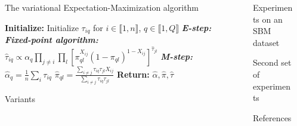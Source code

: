 \documentclass[final]{beamer}
\newlength{\sepwidth}
\newlength{\colwidth}
\newcommand{\separatorcolumn}{\begin{column}{\sepwidth}\end{column}}
\begin{document}
\begin{frame}[t]
\begin{columns}[t]
\begin{column}{\colwidth}
\begin{alertblock}{The variational Expectation-Maximization algorithm}
\begin{minipage}{.9\linewidth}
\begin{algorithm}[H]
\begin{algorithmic}[1]
              \State \textbf{Initialize:} Initialize $\tau_{iq}$ for $i \in \llbracket 1, n \rrbracket$, $q \in \llbracket 1, Q \rrbracket$
              \State \textbf{\emph{E-step:}}
              \State \textbf{\emph{Fixed-point algorithm:}}
              \State $\hat{\tau}_{iq} \propto \alpha_q \prod_{j\neq i}\prod_l \left[\pi_{ql}^{X_{ij}}(1-\pi_{ql})^{1-X_{ij}}\right]^{\hat{\tau}_{jl}}$
              \EndFor
              \EndFor
              \State
              \State \textbf{\emph{M-step:}}
              \State $\hat{\alpha}_q = \frac{1}{n}\sum_{i} \tau_{iq}$ 
              \State $\hat{\pi}_{ql} = \frac{\sum_{i\neq j} \tau_{iq}\tau_{jl}X_{ij}}{\sum_{i\neq j} \tau_{iq}\tau_{jl}}$ 
              \EndFor
              \EndWhile
              \State \textbf{Return:} $\hat{\alpha}, \hat{\pi}, \hat{\tau}$
            \end{algorithmic}
          \end{algorithm}
        \end{minipage}

      \end{alertblock}

      \begin{block}{Variants}

      \end{block}

    \end{column}

    \separatorcolumn

    \begin{column}{\colwidth}

      \begin{block}{Experiments on an SBM dataset}
      \end{block}

      \begin{block}{Second set of experiments}
      \end{block}

      \begin{block}{References}
        \nocite{*}
        \footnotesize{}
      \end{block}

    \end{column}

    \separatorcolumn

  \end{columns}
\end{frame}
\end{document}
